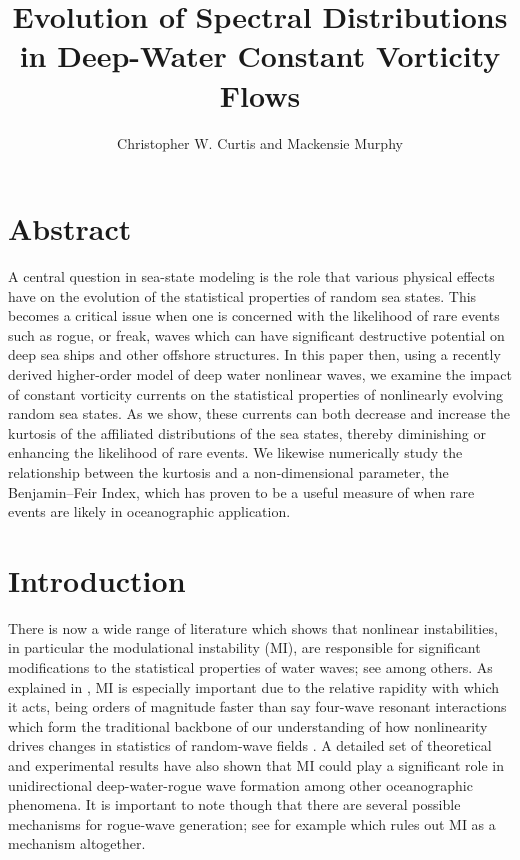 \documentclass[a4paper,11pt]{article}
\title{Evolution of Spectral Distributions in Deep-Water Constant Vorticity Flows}
\author{Christopher W. Curtis and Mackensie Murphy}
\date{}
\begin{document}
\maketitle
\section*{Abstract}
A central question in sea-state modeling is the role that various physical effects have on the evolution of the statistical properties of random sea states.  This becomes a critical issue when one is concerned with the likelihood of rare events such as rogue, or freak, waves which can have significant destructive potential on deep sea ships and other offshore structures.  In this paper then, using a recently derived higher-order model of deep water nonlinear waves, we examine the impact of constant vorticity currents on the statistical properties of nonlinearly evolving random sea states.  As we show, these currents can both decrease and increase the kurtosis of the affiliated distributions of the sea states, thereby diminishing or enhancing the likelihood of rare events.   We likewise numerically study the relationship between the kurtosis and a non-dimensional parameter, the Benjamin--Feir Index, which has proven to be a useful measure of when rare events are likely in oceanographic application.  

\section{Introduction}
There is now a wide range of literature which shows that nonlinear instabilities, in particular the modulational instability (MI), are responsible for significant modifications to the statistical properties of water waves; see \cite{dysthe2,dysthe3,onorato,thomas2012nonlinear} among others.   As explained in \cite{janssen}, MI is especially important due to the relative rapidity with which it acts, being orders of magnitude faster than say four-wave resonant interactions which form the traditional backbone of our understanding of how nonlinearity drives changes in statistics of random-wave fields \cite{hasselmann,holthuijsen}.  A detailed set of theoretical and experimental results \cite{sergeeva1,sergeeva2,sergeeva3,sergeeva4} have also shown that MI could play a significant role in unidirectional deep-water-rogue wave formation among other oceanographic phenomena.  It is important to note though that there are several possible mechanisms for rogue-wave generation; see \cite{fedele} for example which rules out MI as a mechanism altogether.  
\end{document}

